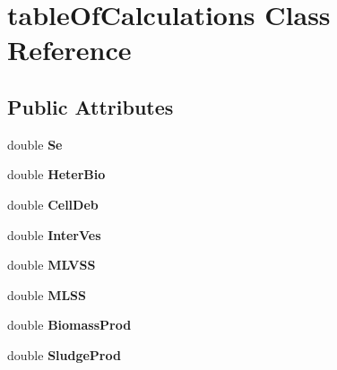 \hypertarget{classtable_of_calculations}{}\section{table\+Of\+Calculations Class Reference}
\label{classtable_of_calculations}
\subsection*{Public Attributes}
\begin{DoxyCompactItemize}
\item 
\mbox{\label{classtable_of_calculations_a8f788dc63fe1f50d64ca43086f524243}} 
double {\bfseries Se}
\item 
\mbox{\label{classtable_of_calculations_acfd0e961783f09965b680265df776066}} 
double {\bfseries Heter\+Bio}
\item 
\mbox{\label{classtable_of_calculations_abec212b992d8d369fdbe7445058196d8}} 
double {\bfseries Cell\+Deb}
\item 
\mbox{\label{classtable_of_calculations_a87c1272c0924d476c5102b17d45136af}} 
double {\bfseries Inter\+Ves}
\item 
\mbox{\label{classtable_of_calculations_a05a6d75924dd3a29876183dfdd7e01f9}} 
double {\bfseries M\+L\+V\+SS}
\item 
\mbox{\label{classtable_of_calculations_afd97d1fae30d8aff68a595db39904281}} 
double {\bfseries M\+L\+SS}
\item 
\mbox{\label{classtable_of_calculations_a0220ea9478121ed17f8da2977ff1fc29}} 
double {\bfseries Biomass\+Prod}
\item 
\mbox{\label{classtable_of_calculations_a9ead8dddb8a5d4eae219955c5d12f781}} 
double {\bfseries Sludge\+Prod}
\item 
\mbox{\label{classtable_of_calculations_ad1698e69e91ebbca9c7bc6f11d3f5ddf}} 

\end{DoxyCompactItemize}

